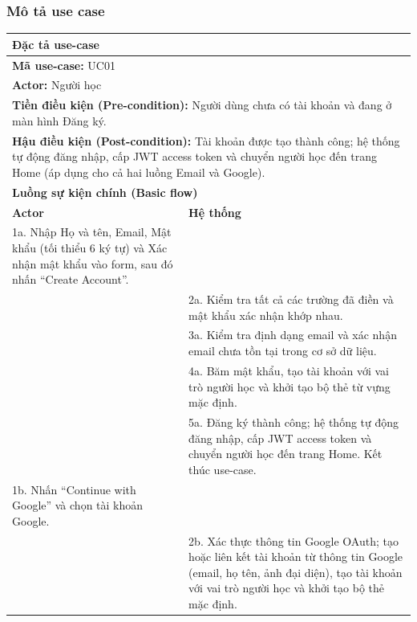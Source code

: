 \subsubsection{Mô tả use case}
\begin{table}[H]
    \centering
    \renewcommand{\arraystretch}{1.3}
    \begin{tabularx}{\linewidth}{|X|X|}
        \hline
        \multicolumn{2}{|l|}{\textbf{Đặc tả use-case}} \\ \hline
        \multicolumn{2}{|l|}{\textbf{Mã use-case:} UC01} \\ \hline
        \multicolumn{2}{|l|}{\textbf{Actor:} Người học} \\ \hline
        \multicolumn{2}{|p{\dimexpr\linewidth-2\tabcolsep-2\arrayrulewidth}|}{\textbf{Tiền điều kiện (Pre-condition):} Người dùng chưa có tài khoản và đang ở màn hình Đăng ký.} \\ \hline
        \multicolumn{2}{|p{\dimexpr\linewidth-2\tabcolsep-2\arrayrulewidth}|}{\textbf{Hậu điều kiện (Post-condition):} Tài khoản được tạo thành công; hệ thống tự động đăng nhập, cấp JWT access token và chuyển người học đến trang Home (áp dụng cho cả hai luồng Email và Google).} \\ \hline
        \multicolumn{2}{|l|}{\textbf{Luồng sự kiện chính (Basic flow)}} \\ \hline
        \textbf{Actor} & \textbf{Hệ thống} \\ \hline
        1a. Nhập Họ và tên, Email, Mật khẩu (tối thiểu 6 ký tự) và Xác nhận mật khẩu vào form, sau đó nhấn ``Create Account''. & \\ \hline
        & 2a. Kiểm tra tất cả các trường đã điền và mật khẩu xác nhận khớp nhau. \\ \hline
        & 3a. Kiểm tra định dạng email và xác nhận email chưa tồn tại trong cơ sở dữ liệu. \\ \hline
        & 4a. Băm mật khẩu, tạo tài khoản với vai trò người học và khởi tạo bộ thẻ từ vựng mặc định. \\ \hline
        & 5a. Đăng ký thành công; hệ thống tự động đăng nhập, cấp JWT access token và chuyển người học đến trang Home. Kết thúc use-case. \\ \hline
        1b. Nhấn ``Continue with Google'' và chọn tài khoản Google. & \\ \hline
        & 2b. Xác thực thông tin Google OAuth; tạo hoặc liên kết tài khoản từ thông tin Google (email, họ tên, ảnh đại diện), tạo tài khoản với vai trò người học và khởi tạo bộ thẻ mặc định. \\ \hline

\end{tabularx}
\end{table}

